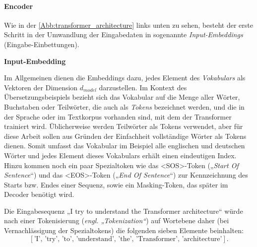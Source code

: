\paragraph{Encoder}
Wie in der \cref{Abb:transformer_architecture} links unten zu sehen, besteht der erste Schritt in der Umwandlung der Eingabedaten in sogenannte \emph{Input-Embeddings} (Eingabe-Einbettungen). 

\textbf{Input-Embedding}

Im Allgemeinen dienen die Embeddings dazu, jedes Element des \emph{Vokabulars} als Vektoren der Dimension $d_{model}$ darzustellen. Im Kontext des Übersetzungsbeispiels bezieht sich das Vokabular auf die Menge aller Wörter, Buchstaben oder Teilwörter, die auch als \emph{Tokens} bezeichnet werden, und die in der Sprache oder im Textkorpus vorhanden sind, mit dem der Transformer trainiert wird. Üblicherweise werden Teilwörter als Tokens verwendet, aber für diese Arbeit sollen aus Gründen der Einfachheit vollständige Wörter als Tokens dienen. Somit umfasst das Vokabular im Beispiel alle englischen und deutschen Wörter und jedes Element dieses Vokabulars erhält einen eindeutigen Index. Hinzu kommen noch ein paar Spezialtoken wie das <SOS>-Token („\emph{Start Of Sentence}“) und das <EOS>-Token („\emph{End Of Sentence}“) zur Kennzeichnung des Starts bzw. Endes einer Sequenz, sowie ein Masking-Token, das später im Decoder benötigt wird. \cite{Formal_Algorithms_for_Transformers_DeepMind}

Die Eingabesequenz „I try to understand the Transformer architecture“ würde nach einer Tokenisierung (\emph{engl. „Tokenization“}) auf Wortebene daher (bei Vernachlässigung der Spezialtokens) die folgenden sieben Elemente beinhalten:
$$[\text{'I', 'try', 'to', 'understand', 'the', 'Transformer', 'architecture'}].$$

